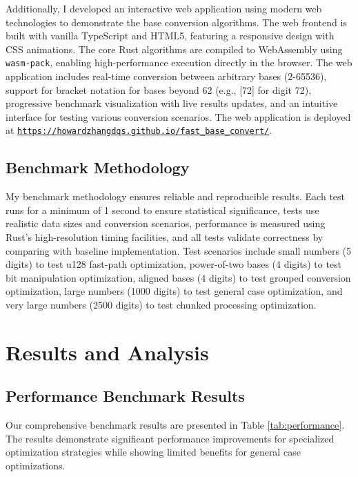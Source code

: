 \documentclass[10pt]{article}
\begin{document}
Additionally, I developed an interactive web application using modern web technologies to demonstrate the base conversion algorithms. The web frontend is built with vanilla TypeScript and HTML5, featuring a responsive design with CSS animations. The core Rust algorithms are compiled to WebAssembly \cite{webassembly2023} using \texttt{wasm-pack}, enabling high-performance execution directly in the browser. The web application includes real-time conversion between arbitrary bases (2-65536), support for bracket notation for bases beyond 62 (e.g., [72] for digit 72), progressive benchmark visualization with live results updates, and an intuitive interface for testing various conversion scenarios. The web application is deployed at \href{https://howardzhangdqs.github.io/fast_base_convert/}{\texttt{https://howardzhangdqs.github.io/fast\_base\_convert/}}.

\subsection{Benchmark Methodology}

My benchmark methodology ensures reliable and reproducible results. Each test runs for a minimum of 1 second to ensure statistical significance, tests use realistic data sizes and conversion scenarios, performance is measured using Rust's high-resolution timing facilities, and all tests validate correctness by comparing with baseline implementation. Test scenarios include small numbers (5 digits) to test u128 fast-path optimization, power-of-two bases (4 digits) to test bit manipulation optimization, aligned bases (4 digits) to test grouped conversion optimization, large numbers (1000 digits) to test general case optimization, and very large numbers (2500 digits) to test chunked processing optimization.

\section{Results and Analysis}

\subsection{Performance Benchmark Results}

Our comprehensive benchmark results are presented in Table \ref{tab:performance}. The results demonstrate significant performance improvements for specialized optimization strategies while showing limited benefits for general case optimizations.
\end{document}
